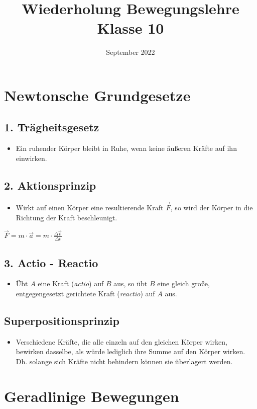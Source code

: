 \documentclass{article}
\title{Wiederholung Bewegungslehre Klasse 10}
\author{September 2022}
\date{}
\begin{document}
\maketitle
\section*{Newtonsche Grundgesetze}
\subsection*{1. Trägheitsgesetz}
\begin{itemize}
	\item Ein ruhender Körper bleibt in Ruhe, wenn keine äußeren Kräfte auf ihn einwirken.
\end{itemize}
\subsection*{2. Aktionsprinzip}
\begin{itemize}
	\item Wirkt auf einen Körper eine resultierende Kraft $\vec{F}$, so wird der Körper in die Richtung der Kraft beschleunigt.
\end{itemize}
\begin{center}
	$\vec{F} = m \cdot \vec{a} = m \cdot \frac{\Delta \vec{v}}{\Delta t}$
\end{center}
\subsection*{3. Actio - Reactio}
\begin{itemize}
	\item Übt $A$ eine Kraft (\textit{actio}) auf $B$ aus, so übt $B$ eine gleich große, entgegengesetzt gerichtete Kraft (\textit{reactio}) auf $A$ aus.
\end{itemize}
\subsection*{Superpositionsprinzip}
\begin{itemize}
	\item Verschiedene Kräfte, die alle einzeln auf den gleichen Körper wirken, bewirken dasselbe, als würde lediglich ihre Summe auf den Körper wirken. Dh. solange sich Kräfte nicht behindern können sie überlagert werden.
\end{itemize}
\section*{Geradlinige Bewegungen}
\end{document}
